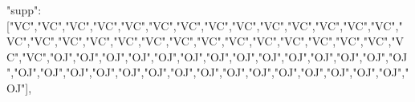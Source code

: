 \documentclass[
  letterpaper,
  DIV=11,
  numbers=noendperiod]{scrartcl}
\newenvironment{Shaded}{\begin{snugshade}}{\end{snugshade}}
\newcommand{\NormalTok}[1]{\textcolor[rgb]{0.00,0.23,0.31}{#1}}
\newcommand{\StringTok}[1]{\textcolor[rgb]{0.13,0.47,0.30}{#1}}
\begin{document}
\begin{Shaded}
\begin{Highlighting}[]
       \StringTok{"supp"}\NormalTok{: [}\StringTok{"VC"}\NormalTok{,}\StringTok{"VC"}\NormalTok{,}\StringTok{"VC"}\NormalTok{,}\StringTok{"VC"}\NormalTok{,}\StringTok{"VC"}\NormalTok{,}\StringTok{"VC"}\NormalTok{,}\StringTok{"VC"}\NormalTok{,}\StringTok{"VC"}\NormalTok{,}\StringTok{"VC"}\NormalTok{,}\StringTok{"VC"}\NormalTok{,}\StringTok{"VC"}\NormalTok{,}\StringTok{"VC"}\NormalTok{,}\StringTok{"VC"}\NormalTok{,}\StringTok{"VC"}\NormalTok{,}\StringTok{"VC"}\NormalTok{,}\StringTok{"VC"}\NormalTok{,}\StringTok{"VC"}\NormalTok{,}\StringTok{"VC"}\NormalTok{,}\StringTok{"VC"}\NormalTok{,}\StringTok{"VC"}\NormalTok{,}\StringTok{"VC"}\NormalTok{,}\StringTok{"VC"}\NormalTok{,}\StringTok{"VC"}\NormalTok{,}\StringTok{"VC"}\NormalTok{,}\StringTok{"VC"}\NormalTok{,}\StringTok{"VC"}\NormalTok{,}\StringTok{"VC"}\NormalTok{,}\StringTok{"VC"}\NormalTok{,}\StringTok{"VC"}\NormalTok{,}\StringTok{"VC"}\NormalTok{,}\StringTok{"OJ"}\NormalTok{,}\StringTok{"OJ"}\NormalTok{,}\StringTok{"OJ"}\NormalTok{,}\StringTok{"OJ"}\NormalTok{,}\StringTok{"OJ"}\NormalTok{,}\StringTok{"OJ"}\NormalTok{,}\StringTok{"OJ"}\NormalTok{,}\StringTok{"OJ"}\NormalTok{,}\StringTok{"OJ"}\NormalTok{,}\StringTok{"OJ"}\NormalTok{,}\StringTok{"OJ"}\NormalTok{,}\StringTok{"OJ"}\NormalTok{,}\StringTok{"OJ"}\NormalTok{,}\StringTok{"OJ"}\NormalTok{,}\StringTok{"OJ"}\NormalTok{,}\StringTok{"OJ"}\NormalTok{,}\StringTok{"OJ"}\NormalTok{,}\StringTok{"OJ"}\NormalTok{,}\StringTok{"OJ"}\NormalTok{,}\StringTok{"OJ"}\NormalTok{,}\StringTok{"OJ"}\NormalTok{,}\StringTok{"OJ"}\NormalTok{,}\StringTok{"OJ"}\NormalTok{,}\StringTok{"OJ"}\NormalTok{,}\StringTok{"OJ"}\NormalTok{,}\StringTok{"OJ"}\NormalTok{,}\StringTok{"OJ"}\NormalTok{,}\StringTok{"OJ"}\NormalTok{,}\StringTok{"OJ"}\NormalTok{,}\StringTok{"OJ"}\NormalTok{],}

\end{Highlighting}
\end{Shaded}
\end{document}
